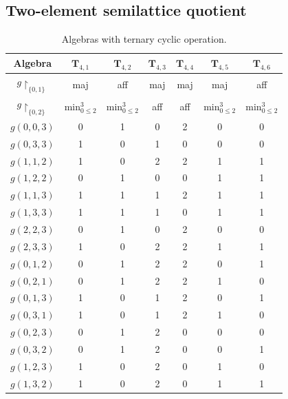 \documentclass[11pt]{amsart}
\theoremstyle{definition}
\theoremstyle{remark}
\theoremstyle{plain}
\def\T{\mathbf{T}}
\begin{document}
\subsection{Two-element semilattice quotient}\label{s:semi}

\begin{table}[h!]
\centering
 \begin{tabular}{|c||c|c|c|c|c|c|}
\hline
    Algebra & $\T_{4,1}$ & $\T_{4,2}$ & $\T_{4,3}$ & $\T_{4,4}$ & $\T_{4,5}$ & $\T_{4,6}$\\
\hline\hline
     $g{\restriction_{\{0,1\}}}$  & maj& aff & maj & maj & maj & aff  \\
\hline
    $g{\restriction_{\{0,2\}}}$  & $\text{min}^3_{0\leqslant 2}$ & $\text{min}^3_{0\leqslant 2}$ & aff & aff & $\text{min}^3_{0\leqslant 2}$ & $\text{min}^3_{0\leqslant 2}$ \\

\hline
	$g(0,0,3)$ & 0 & 1 & 0 & 2 &0 & 0\\
\hline
	$g(0,3,3)$ & 1 & 0 & 1 & 0 &0 & 0\\	

\hline
    $g(1,1,2)$  & 1 & 0 & 2 & 2 & 1 & 1 \\
\hline
	$g(1,2,2)$  & 0 & 1 & 0 & 0 & 1 & 1\\
	
\hline
    $g(1,1,3)$  & 1 & 1 & 1 & 2 & 1 & 1 \\
\hline
	$g(1,3,3)$ & 1 & 1 & 1 & 0 & 1& 1\\

\hline
	$g(2,2,3)$ & 0 & 1 & 0 & 2 & 0 & 0\\
\hline
	$g(2,3,3)$ & 1 & 0 & 2 & 2 & 1 & 1\\

\hline
	$g(0,1,2)$ & 0 & 1 & 2 & 2 & 0 & 1\\
\hline
	$g(0,2,1)$ & 0 & 1 & 2 & 2 & 1 & 0\\
\hline
	$g(0,1,3)$ & 1 & 0 & 1 & 2 & 0 & 1\\
\hline
	$g(0,3,1)$ & 1 & 0 & 1 & 2 & 1 & 0\\
\hline
	$g(0,2,3)$ & 0 & 1 & 2 & 0 & 0 & 0\\
\hline
	$g(0,3,2)$ & 0 & 1 & 2 & 0 & 0 & 1\\
\hline
	$g(1,2,3)$ & 1 & 0 & 2 & 0 & 1 & 0\\
\hline
	$g(1,3,2)$ & 1 & 0 & 2 & 0 & 1 & 1\\
\hline
\end{tabular}  
\caption{Algebras with ternary cyclic operation.}
\label{table:5}
\end{table}
\end{document}
